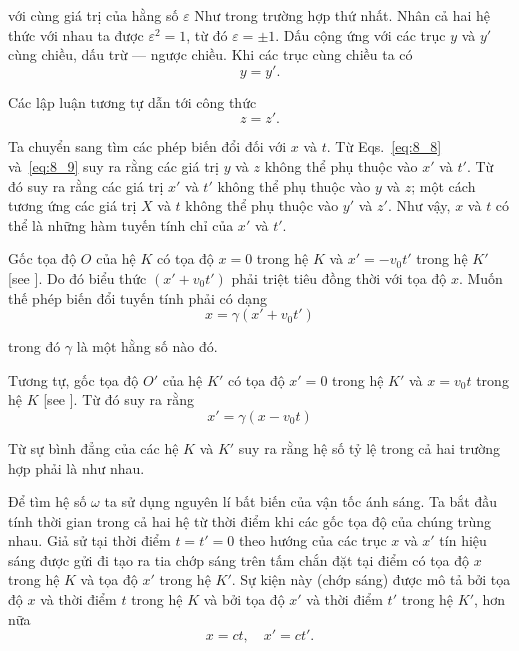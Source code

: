 \noindent
với cùng giá trị của hằng số $\varepsilon$ Như trong trường hợp thứ nhất. Nhân cả hai hệ thức với nhau ta được $\varepsilon^2 = 1$, từ đó $\varepsilon=\pm 1$. Dấu cộng ứng với các trục $y$ và $y'$ cùng chiều, dấu trừ --- ngược chiều. Khi các trục cùng chiều ta có
\begin{equation}\label{eq:8_8}
	y = y'.
\end{equation}

\noindent
Các lập luận tương tự dẫn tới công thức
\begin{equation}\label{eq:8_9}
	z = z'.
\end{equation}

Ta chuyển sang tìm các phép biến đổi đối với $x$ và $t$. Từ Eqs.~\eqref{eq:8_8} và~\eqref{eq:8_9} suy ra rằng các giá trị $y$ và $z$ không thể phụ thuộc vào $x'$ và $t'$. Từ đó suy ra rằng các giá trị $x'$ và $t'$ không thể phụ thuộc vào $y$ và $z$; một cách tương ứng các giá trị $X$ và $t$ không thể phụ thuộc vào $y'$ và $z'$. Như vậy, $x$ và $t$ có thể là những hàm tuyến tính chỉ của $x'$ và $t'$.

Gốc tọa độ $O$ của hệ $K$ có tọa độ $x=0$ trong hệ $K$ và $x'=-v_0 t'$ trong hệ $K'$ [see ]. Do đó biểu thức $(x'+v_0 t')$ phải triệt tiêu đồng thời với tọa độ $x$. Muốn thế phép biến đổi tuyến tính phải có dạng
\begin{equation}\label{eq:8_10}
	x = \gamma (x' + v_0 t')
\end{equation}

\noindent
trong đó $\gamma$ là một hằng số nào đó.

Tương tự, gốc tọa độ $O'$ của hệ $K'$ có tọa độ $x'=0$ trong hệ $K'$ và $x=v_0 t$ trong hệ $K$ [see ]. Từ đó suy ra rằng
\begin{equation}\label{eq:8_11}
	x' = \gamma (x - v_0 t)
\end{equation}

\noindent
Từ sự bình đẳng của các hệ $K$ và $K'$ suy ra rằng hệ số tỷ lệ trong cả hai trường hợp phải là như nhau.

Để tìm hệ số $\omega$ ta sử dụng nguyên lí bất biến của vận tốc ánh sáng. Ta bắt đầu tính thời gian trong cả hai hệ từ thời điểm khi các gốc tọa độ của chúng trùng nhau. Giả sử tại thời điểm $t=t'=0$ theo hướng của các trục $x$ và $x'$ tín hiệu sáng được gửi đi tạo ra tia chớp sáng trên tấm chắn đặt tại điểm có tọa độ $x$ trong hệ $K$ và tọa độ $x'$ trong hệ $K'$. Sự kiện này (chớp sáng) được mô tả bởi tọa độ $x$ và thời điểm $t$ trong hệ $K$ và bởi tọa độ $x'$ và thời điểm $t'$ trong hệ $K'$, hơn nữa
\begin{equation*}
	x = ct,\quad x' = ct'.
\end{equation*}

